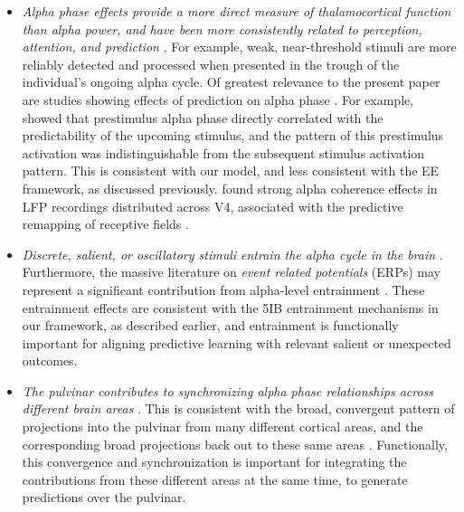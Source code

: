 \documentclass[11pt,twoside]{article}
\newif\myifpdf
\begin{document}
\begin{itemize}
	\item \emph{Alpha phase effects provide a more direct measure of thalamocortical function than alpha power, and have been more consistently related to perception, attention, and prediction}  \citep{NunnOsselton74,VarelaToroJohnEtAl81,VanRullenKoch03,BuschDuboisVanRullen09,MathewsonFabianiGrattonEtAl10,PalvaPalva11,JaegleRo13,NeupaneGuittonPack17,Solis-VivancoJensenBonnefond18}.  For example, weak, near-threshold stimuli are more reliably detected and processed when presented in the trough of the individual's ongoing alpha cycle.  Of greatest relevance to the present paper are studies showing effects of prediction on alpha phase \citep{SamahaBauerCimaroliEtAl15,MayerSchwiedrzikWibralEtAl16,ShermanKanaiSethEtAl16}.  For example, \citet{MayerSchwiedrzikWibralEtAl16} showed that prestimulus alpha phase directly correlated with the predictability of the upcoming stimulus, and the pattern of this prestimulus activation was indistinguishable from the subsequent stimulus activation pattern.  This is consistent with our model, and less consistent with the EE framework, as discussed previously.  \citet{NeupaneGuittonPack17} found strong alpha coherence effects in LFP recordings distributed across V4, associated with the predictive remapping of receptive fields \citep{DuhamelColbyGoldberg92}.

	\item \emph{Discrete, salient, or oscillatory stimuli entrain the alpha cycle in the brain} \citep{SpaakLangeJensen14,MathewsonPrudhommeFabianiEtAl12}.  Furthermore, the massive literature on \emph{event related potentials} (ERPs) may represent a significant contribution from alpha-level entrainment \citep{MakeigWesterfieldJungEtAl02,GruberKlimeschSausengEtAl05,Klimesch11}.  These entrainment effects are consistent with the 5IB entrainment mechanisms in our framework, as described earlier, and entrainment is functionally important for aligning predictive learning with relevant salient or unexpected outcomes.

	\item \emph{The pulvinar contributes to synchronizing alpha phase relationships across different brain areas} \citep{SaalmannPinskWangEtAl12,FiebelkornPinskKastner18}.  This is consistent with the broad, convergent pattern of projections into the pulvinar from many different cortical areas, and the corresponding broad projections back out to these same areas \citep{Shipp03,ArcaroPinskKastner15}.  Functionally, this convergence and synchronization is important for integrating the contributions from these different areas at the same time, to generate predictions over the pulvinar.


\end{itemize}
\end{document}
